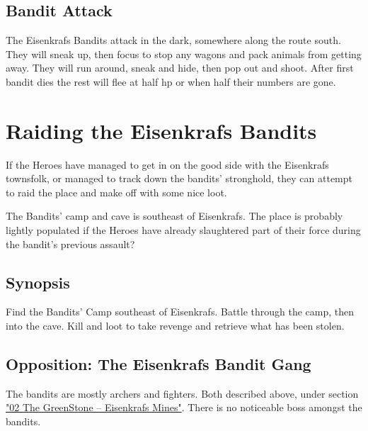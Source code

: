 \subsection*{Bandit Attack}
The Eisenkrafs Bandits attack in the dark, somewhere along the route south. They will sneak up, then focus to stop any wagons and pack animals from getting away. They will run around, sneak and hide, then pop out and shoot. After first bandit dies the rest will flee at half hp or when half their numbers are gone.

















\clearpage
{}
\section*{Raiding the Eisenkrafs Bandits}

If the Heroes have managed to get in on the good side with the Eisenkrafs townsfolk, or managed to track down the bandits' stronghold, they can attempt to raid the place and make off with some nice loot.

The Bandits' camp and cave is southeast of Eisenkrafs. The place is probably lightly populated if the Heroes have already slaughtered part of their force during the bandit's previous assault?


\subsection*{Synopsis}
Find the Bandits' Camp southeast of Eisenkrafs. Battle through the camp, then into the cave. Kill and loot to take revenge and retrieve what has been stolen.


\subsection*{Opposition: The Eisenkrafs Bandit Gang}
The bandits are mostly archers and fighters. Both described above, under section \hyperref[sec:02GreenStone]{"02 The GreenStone -- Eisenkrafs Mines"}. There is no noticeable boss amongst the bandits.

